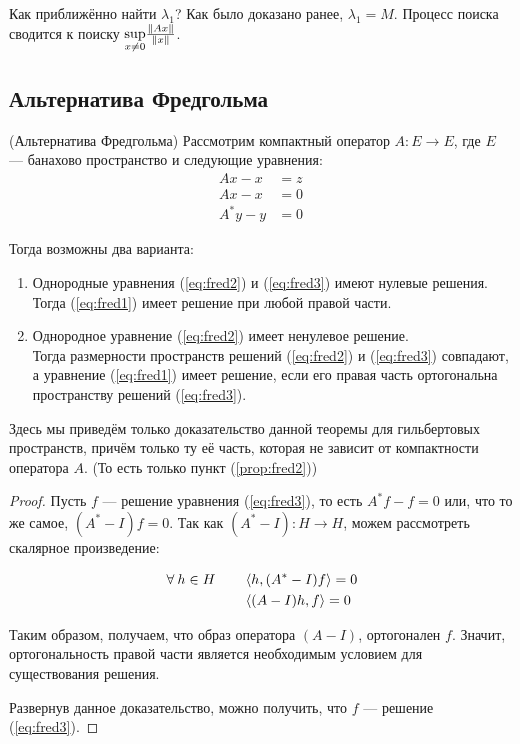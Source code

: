 \documentclass[12pt]{article}
\begin{document}
	Как приближённо найти $\lambda_1$? Как было доказано ранее, $\lambda_1 = M$. Процесс поиска сводится к поиску 
	$\underset{x\neq0}{\sup}{\frac{\left\| Ax \right\|}{\left\| x \right\|}}$.
	
	\subsection{Альтернатива Фредгольма}
	
	\begin{theorem}
		(Альтернатива Фредгольма) Рассмотрим компактный оператор $A: E\rightarrow E$, где $E$ --- банахово 
		пространство и следующие уравнения:
		\begin{align}
			Ax - x &= z   \tag{но} \label{eq:fred1} \\
			Ax - x &= 0   \tag{о} \label{eq:fred2} \\
			A^*y - y &= 0 \tag{со} \label{eq:fred3}
		\end{align}
		
		Тогда возможны два варианта:
		\begin{enumerate}
			\item Однородные уравнения (\ref{eq:fred2}) и (\ref{eq:fred3}) имеют нулевые решения. \label{prop:fred1}\\
			Тогда (\ref{eq:fred1}) имеет решение при любой правой части.
			
			\item Однородное уравнение (\ref{eq:fred2}) имеет ненулевое решение. \label{prop:fred2}\\
			Тогда размерности пространств решений (\ref{eq:fred2}) и (\ref{eq:fred3}) совпадают,
			а уравнение (\ref{eq:fred1}) имеет решение, если его правая часть ортогональна 
			пространству решений (\ref{eq:fred3}).
		\end{enumerate}
	\end{theorem}
	Здесь мы приведём только доказательство данной теоремы для гильбертовых пространств, причём только ту её 
	часть, которая не зависит от компактности оператора $A$. (То есть только пункт (\ref{prop:fred2}))
	\begin{proof}
		Пусть $f$ --- решение уравнения (\ref{eq:fred3}), то есть $A^*f - f = 0$ или, что то же самое, 
		$(A^* - I)f = 0$. Так как $(A^* - I): H \rightarrow H$, можем рассмотреть скалярное произведение:
		
		\begin{align*}
			\forall h \in H \qquad &\scal{h}{(A^*-I)f} = 0 \\
			                       &\scal{(A-I)h}{f} = 0
		\end{align*}
		
		Таким образом, получаем, что образ оператора $(A-I)$, ортогонален $f$. Значит, ортогональность 
		правой части является необходимым условием для существования решения.
		
		Развернув данное доказательство, можно получить, что $f$ --- решение (\ref{eq:fred3}).
	\end{proof}
	
\end{document}
